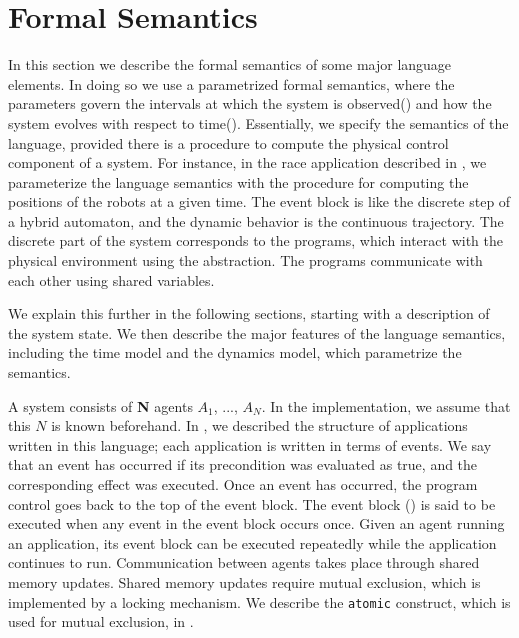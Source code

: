 \section[h]{Formal Semantics}
\label{sect:semantics}

In this section we describe the formal semantics of some major language elements. In doing so we use a parametrized formal semantics, where the parameters govern the intervals at which the system is observed() and how the system evolves with respect to time(). Essentially, we specify the semantics of the language, provided there is a procedure to compute the physical control component of a system. For instance, in the race application described in , we parameterize the language semantics with the procedure for computing the positions of the robots at a given time. The event block is like the discrete step of a hybrid automaton, and the dynamic behavior is the continuous trajectory\cite{hioa}. The discrete part of the system corresponds to the programs, which interact with the physical environment using the  abstraction. The programs communicate with each other using shared variables.

We explain this further in the following sections, starting with a description of the system state. We then describe the major features of the language semantics, including the time model and the dynamics model, which parametrize the semantics. 
 
A system consists of \textbf{N} agents $A_1$, ..., $A_N$. In the implementation, we assume that this $N$ is known beforehand. In , we described the structure of applications written in this language; each application is written in terms of events. We say that an event has occurred if its precondition was evaluated as true, and the corresponding effect was executed. Once an event has occurred, the program control goes back to the top of the event block. The event block () is said to be executed when any event in the event block occurs once. Given an agent running an application, its event block can be executed repeatedly while the application continues to run. Communication between agents takes place through shared memory updates. Shared memory updates require mutual exclusion, which is implemented by a locking mechanism. We describe the \verb|atomic| construct, which is used for mutual exclusion, in .



